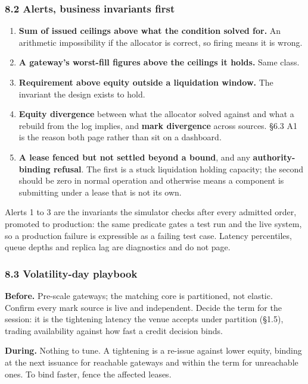 \documentclass[10pt,a4paper]{article}
\providecommand{\tightlist}{\setlength{\itemsep}{0pt}\setlength{\parskip}{0pt}}
\begin{document}
\subsubsection{8.2 Alerts, business invariants first}\label{alerts-business-invariants-first}

\begin{enumerate}
\def\labelenumi{\arabic{enumi}.}
\tightlist
\item
  \textbf{Sum of issued ceilings above what the condition solved for.} An arithmetic
  impossibility if the allocator is correct, so firing means it is wrong.
\item
  \textbf{A gateway's worst-fill figures above the ceilings it holds.} Same class.
\item
  \textbf{Requirement above equity outside a liquidation window.} The invariant the
  design exists to hold.
\item
  \textbf{Equity divergence} between what the allocator solved against and what a
  rebuild from the log implies, and \textbf{mark divergence} across sources. §6.3 A1
  is the reason both page rather than sit on a dashboard.
\item
  \textbf{A lease fenced but not settled beyond a bound}, and any \textbf{authority-binding
  refusal}. The first is a stuck liquidation holding capacity; the second
  should be zero in normal operation and otherwise means a component is
  submitting under a lease that is not its own.
\end{enumerate}

Alerts 1 to 3 are the invariants the simulator checks after every admitted order,
promoted to production: the same predicate gates a test run and the live system,
so a production failure is expressible as a failing test case. Latency
percentiles, queue depths and replica lag are diagnostics and do not page.

\subsubsection{8.3 Volatility-day playbook}\label{volatility-day-playbook}

\textbf{Before.} Pre-scale gateways; the matching core is partitioned, not elastic.
Confirm every mark source is live and independent. Decide the term for the
session: it is the tightening latency the venue accepts under partition (§1.5),
trading availability against how fast a credit decision binds.

\textbf{During.} Nothing to tune. A tightening is a re-issue against lower equity,
binding at the next issuance for reachable gateways and within the term for
unreachable ones. To bind faster, fence the affected leases.
\end{document}
